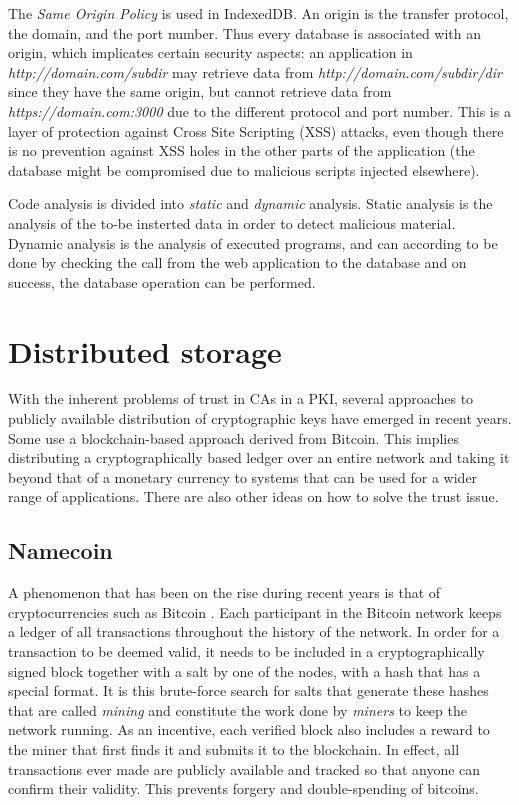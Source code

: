 The \emph{Same Origin Policy} is used in IndexedDB. An origin is the transfer protocol, the domain, and the port number. Thus every database is associated with an origin, which implicates certain security aspects: an application in \emph{http://domain.com/subdir} may retrieve data from \emph{http://domain.com/subdir/dir} since they have the same origin, but cannot retrieve data from \emph{https://domain.com:3000} due to the different protocol and port number. This is a layer of protection against Cross Site Scripting (XSS) attacks, even though there is no prevention against XSS holes in the other parts of the application (the database might be compromised due to malicious scripts injected elsewhere).

Code analysis is divided into \emph{static} and \emph{dynamic} analysis. Static analysis is the analysis of the to-be insterted data in order to detect malicious material. Dynamic analysis is the analysis of executed programs, and can according to \cite{IndexedDBSecurity:2012:Online} be done by checking the call from the web application to the database and on success, the database operation can be performed.

\section{Distributed storage}
With the inherent problems of trust in CAs in a PKI, several approaches to publicly available distribution of cryptographic keys have emerged in recent years. Some use a blockchain-based approach derived from Bitcoin. This implies distributing a cryptographically based ledger over an entire network and taking it beyond that of a monetary currency to systems that can be used for a wider range of applications. There are also other ideas on how to solve the trust issue.

\subsection{Namecoin}
A phenomenon that has been on the rise during recent years is that of cryptocurrencies such as Bitcoin \cite{CryptoCoinInsider:2014:Online}. Each participant in the Bitcoin network keeps a ledger of all transactions throughout the history of the network. In order for a transaction to be deemed valid, it needs to be included in a cryptographically signed block together with a salt by one of the nodes, with a hash that has a special format. It is this brute-force search for salts that generate these hashes that are called \emph{mining} and constitute the work done by \emph{miners} to keep the network running. As an incentive, each verified block also includes a reward to the miner that first finds it and submits it to the blockchain\cite{InternetForBeginners:2014:Online}. In effect, all transactions ever made are publicly available and tracked so that anyone can confirm their validity. This prevents forgery and double-spending of bitcoins.

